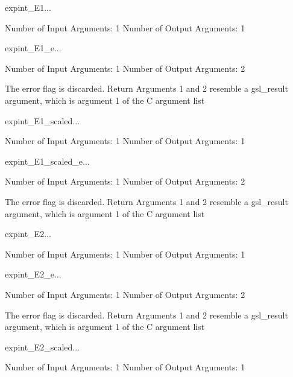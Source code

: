 \begin{funcdesc}{expint_E1}{...}

    Number of Input  Arguments:  1
    Number of Output Arguments:  1
\end{funcdesc}

\begin{funcdesc}{expint_E1_e}{...}

    Number of Input  Arguments:  1
    Number of Output Arguments:  2

The error flag is discarded.
Return Arguments 1 and 2 resemble a gsl_result argument,
	which is  argument 1 of the C argument list

\end{funcdesc}

\begin{funcdesc}{expint_E1_scaled}{...}

    Number of Input  Arguments:  1
    Number of Output Arguments:  1
\end{funcdesc}

\begin{funcdesc}{expint_E1_scaled_e}{...}

    Number of Input  Arguments:  1
    Number of Output Arguments:  2

The error flag is discarded.
Return Arguments 1 and 2 resemble a gsl_result argument,
	which is  argument 1 of the C argument list

\end{funcdesc}

\begin{funcdesc}{expint_E2}{...}

    Number of Input  Arguments:  1
    Number of Output Arguments:  1
\end{funcdesc}

\begin{funcdesc}{expint_E2_e}{...}

    Number of Input  Arguments:  1
    Number of Output Arguments:  2

The error flag is discarded.
Return Arguments 1 and 2 resemble a gsl_result argument,
	which is  argument 1 of the C argument list

\end{funcdesc}

\begin{funcdesc}{expint_E2_scaled}{...}

    Number of Input  Arguments:  1
    Number of Output Arguments:  1
\end{funcdesc}

